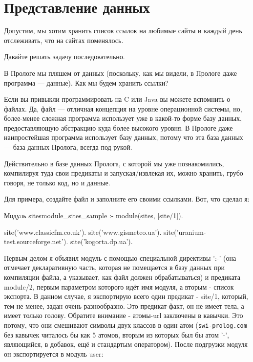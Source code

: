 \documentclass[a4paper]{book}
\begin{document}
\section{Представление данных}

Допустим, мы хотим хранить список ссылок на любимые сайты и
каждый день отслеживать, что на сайтах поменялось.

Давайте решать задачу последовательно.

В Прологе мы пляшем от данных (поскольку, как мы видели, в
Прологе даже программа --- данные). Как мы будем хранить ссылки?

Если вы привыкли программировать на C или Java вы можете
вспомнить о файлах. Да, файл --- отличная концепция на уровне
операционной системы, но, более-менее сложная программа
использует уже в какой-то форме базу данных, предоставляющую
абстракцию куда более высокого уровня. В Прологе даже
наипростейшая программа использует базу данных, потому что эта
база данных --- база данных Пролога, всегда под рукой.

Действительно в базе данных Пролога, с которой мы уже
познакомились, компилируя туда свои предикаты и запуская/извлекая
их, можно хранить, грубо говоря, не только код, но и данные.

Для примера, создайте файл и заполните его своими ссылками. Вот,
что сделал я:

\begin{example}{Модуль sites}{module_sites_sample}
:- module(sites, [site/1]).

site('www.classicfm.co.uk').
site('www.gismeteo.ua').
site('uranium-test.sourceforge.net').
site('kogorta.dp.ua').
\end{example}

Первым делом я объявил модуль с помощью специальной директивы
':-' (она отмечает декларативную часть, которая не помещается в
базу данных при компиляции файла, а указывает, как файл должен
обрабатываться) и предиката module/2, первым параметром которого
идёт имя модуля, а вторым - список экспорта. В данном случае, я
экспортирую всего один предикат - site/1, который, тем не менее,
задан очень разнообразно. Это предикат-факт, он не имеет тела, а
имеет только голову. Обратите внимание - атомы-url заключены в
кавычки. Это потому, что они смешивают символы двух классов в
один атом (\verb|swi-prolog.com| без кавычек читалось бы как 5
атомов, вторым из которых был бы атом '-', являющийся, в добавок,
ещё и стандартым оператором). После подгрузки модуля он
экспортируется в модуль user:    
\end{document}
